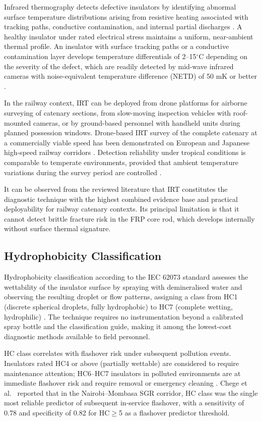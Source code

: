 \documentclass[preprint,12pt,3p]{elsarticle}
\begin{document}
Infrared thermography detects defective insulators by identifying
abnormal surface temperature distributions arising from resistive heating
associated with tracking paths, conductive contamination, and internal
partial discharges \cite{Mehmood2022, Gubanski1990}. A healthy insulator
under rated electrical stress maintains a uniform, near-ambient thermal
profile. An insulator with surface tracking paths or a conductive
contamination layer develops temperature differentials of 2--15$^\circ$C
depending on the severity of the defect, which are readily detected by
mid-wave infrared cameras with noise-equivalent temperature difference
(NETD) of 50 mK or better \cite{Mehmood2022}.

In the railway context, IRT can be deployed from drone platforms for
airborne surveying of catenary sections, from slow-moving inspection
vehicles with roof-mounted cameras, or by ground-based personnel with
handheld units during planned possession windows. Drone-based IRT survey
of the complete catenary at a commercially viable speed has been
demonstrated on European and Japanese high-speed railway corridors
\cite{Diagnostics2021}. Detection reliability under tropical conditions
is comparable to temperate environments, provided that ambient temperature
variations during the survey period are controlled \cite{Mehmood2022}.

It can be observed from the reviewed literature that IRT constitutes
the diagnostic technique with the highest combined evidence base and
practical deployability for railway catenary contexts. Its principal
limitation is that it cannot detect brittle fracture risk in the FRP
core rod, which develops internally without surface thermal signature.

\subsection{Hydrophobicity Classification}

Hydrophobicity classification according to the IEC 62073 standard
assesses the wettability of the insulator surface by spraying with
demineralised water and observing the resulting droplet or flow
patterns, assigning a class from HC1 (discrete spherical droplets,
fully hydrophobic) to HC7 (complete wetting, hydrophilic)
\cite{IEC62073}. The technique requires no instrumentation beyond
a calibrated spray bottle and the classification guide, making it
among the lowest-cost diagnostic methods available to field personnel.

HC class correlates with flashover risk under subsequent pollution
events. Insulators rated HC4 or above (partially wettable) are
considered to require maintenance attention; HC6--HC7 insulators
in polluted environments are at immediate flashover risk and require
removal or emergency cleaning \cite{Gubanski1990}. Chege et al.\
\cite{Chege2019} reported that in the Nairobi--Mombasa SGR corridor,
HC class was the single most reliable predictor of subsequent in-service
flashover, with a sensitivity of 0.78 and specificity of 0.82 for
HC$\geq$5 as a flashover predictor threshold.
\end{document}
